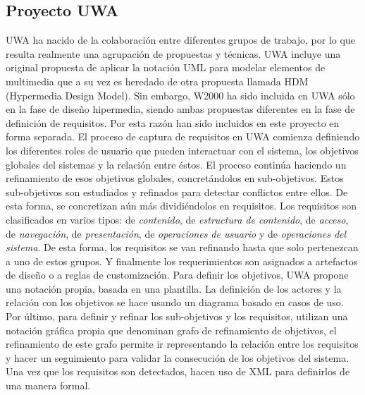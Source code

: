 \subsection{Proyecto UWA}

UWA ha nacido de la colaboración entre diferentes grupos de trabajo, por lo que
resulta realmente una agrupación de
propuestas y técnicas. UWA incluye una original propuesta de aplicar la
notación UML para modelar elementos de multimedia que a su vez es heredado
de otra propuesta llamada HDM (Hypermedia Design Model)\cite{HDM11}. Sin
embargo, W2000 ha sido incluida en UWA sólo en la fase de diseño hipermedia,
siendo ambas propuestas diferentes en la fase de definición
de requisitos. Por esta razón han sido incluidos en este proyecto en forma
separada. El proceso de captura de requisitos
en UWA\cite{uwa32} comienza definiendo los diferentes roles de usuario que
pueden interactuar con el sistema, los objetivos
globales del sistemas y la relación entre éstos. El proceso continúa haciendo
un refinamiento de esos objetivos
globales, concretándolos en sub-objetivos. Estos sub-objetivos son estudiados y
refinados para detectar conflictos entre
ellos. De esta forma, se concretizan aún más dividiéndolos en requisitos. Los
requisitos son clasificados en varios tipos:
de \textit{contenido}, de \textit{estructura de contenido}, de \textit{acceso},
de \textit{navegación}, de
\textit{presentación}, de \textit{operaciones de usuario} y de
\textit{operaciones del sistema}. De esta forma, los requisitos se van refinando
hasta que solo pertenezcan a uno de estos grupos. Y finalmente los
requerimientos son asignados a artefactos de diseño o a reglas de customización.
Para definir los objetivos, UWA propone una notación propia, basada en una
plantilla. La definición de los actores y la relación con
los objetivos se hace usando un diagrama basado en casos de uso. Por último,
para definir y refinar los sub-objetivos y los requisitos, utilizan una notación
gráfica propia que denominan grafo de refinamiento de objetivos, el refinamiento
de este grafo permite ir representando la relación entre los requisitos y hacer
un seguimiento para validar la consecución de los objetivos del sistema. Una vez
que los requisitos son detectados, hacen uso de XML para definirlos de una
manera formal.



